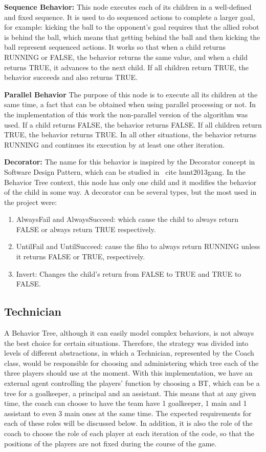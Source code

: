 \documentclass[conference]{IEEEtran}
\begin{document}
\textbf{Sequence Behavior:} This node executes each of its children in a well-defined and fixed sequence. It is used to do sequenced actions to complete a larger goal, for example: kicking the ball to the opponent's goal requires that the allied robot is behind the ball, which means that getting behind the ball and then kicking the ball represent sequenced actions. It works so that when a child returns RUNNING or FALSE, the behavior returns the same value, and when a child returns TRUE, it advances to the next child. If all children return TRUE, the behavior succeeds and also returns TRUE.


\textbf{Parallel Behavior} The purpose of this node is to execute all its children at the same time, a fact that can be obtained when using parallel processing or not. In the implementation of this work the non-parallel version of the algorithm was used. If a child returns FALSE, the behavior returns FALSE. If all children return TRUE, the behavior returns TRUE. In all other situations, the behavior returns RUNNING and continues its execution by at least one other iteration.

\textbf{Decorator:} The name for this behavior is inspired by the Decorator concept in Software Design Pattern, which can be studied in \ cite {hunt2013gang}. In the Behavior Tree context, this node has only one child and it modifies the behavior of the child in some way. A decorator can be several types, but the most used in the project were:

\begin{enumerate}
\item AlwaysFail and AlwaysSucceed: which cause the child to always return FALSE or always return TRUE respectively.
\item UntilFail and UntilSucceed: cause the fiho to always return RUNNING unless it returns FALSE or TRUE, respectively.
\item Invert: Changes the child's return from FALSE to TRUE and TRUE to FALSE.
\end {enumerate}

\subsection{Technician}

A Behavior Tree, although it can easily model complex behaviors, is not always the best choice for certain situations. Therefore, the strategy was divided into levels of different abstractions, in which a Technician, represented by the Coach class, would be responsible for choosing and administering which tree each of the three players should use at the moment.
With this implementation, we have an external agent controlling the players' function by choosing a BT, which can be a tree for a goalkeeper, a principal and an assistant. This means that at any given time, the coach can choose to have the team have 1 goalkeeper, 1 main and 1 assistant to even 3 main ones at the same time. The expected requirements for each of these roles will be discussed below. In addition, it is also the role of the coach to choose the role of each player at each iteration of the code, so that the positions of the players are not fixed during the course of the game.
\end{document}
